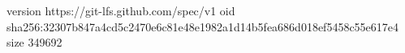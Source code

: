 version https://git-lfs.github.com/spec/v1
oid sha256:32307b847a4cd5c2470e6c81e48e1982a1d14b5fea686d018ef5458c55e617e4
size 349692
